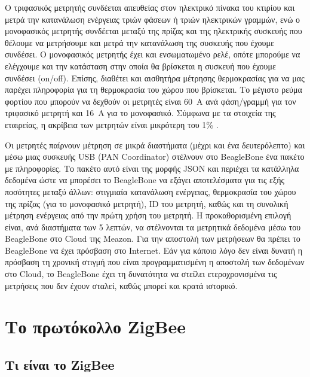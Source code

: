 \documentclass[12pt, a4paper, oneside]{report}
\begin{document}
Ο τριφασικός μετρητής συνδέεται απευθείας στον ηλεκτρικό πίνακα του κτιρίου και μετρά την κατανάλωση ενέργειας τριών φάσεων ή τριών ηλεκτρικών γραμμών, ενώ ο μονοφασικός μετρητής συνδέεται μεταξύ της πρίζας και της ηλεκτρικής συσκευής που θέλουμε να μετρήσουμε και μετρά την κατανάλωση της συσκευής που έχουμε συνδέσει. Ο μονοφασικός μετρητής έχει και ενσωματωμένο ρελέ, οπότε μπορούμε να ελέγχουμε και την κατάσταση στην οποία θα βρίσκεται η συσκευή που έχουμε συνδέσει (on\slash of\mbox{}f). Επίσης, διαθέτει και αισθητήρα μέτρησης θερμοκρασίας για να μας παρέχει πληροφορία για τη θερμοκρασία του χώρου που βρίσκεται. Το μέγιστο ρεύμα φορτίου που μπορούν να δεχθούν οι μετρητές είναι 60~A ανά φάση\slash γραμμή για τον τριφασικό μετρητή και 16~A για το μονοφασικό. Σύμφωνα με τα στοιχεία της εταιρείας, η ακρίβεια των μετρητών είναι μικρότερη του 1\% \cite{biz,din}.

Οι μετρητές παίρνουν μέτρηση σε μικρά διαστήματα (μέχρι και ένα δευτερόλεπτο) και μέσω μιας συσκευής USB (PAN Coordinator) στέλνουν στο BeagleBone ένα πακέτο με πληροφορίες. Το πακέτο αυτό είναι της μορφής JSON και περιέχει τα κατάλληλα δεδομένα ώστε να μπορέσει το BeagleBone να εξάγει αποτελέσματα για τις εξής ποσότητες μεταξύ άλλων: στιγμιαία κατανάλωση ενέργειας, θερμοκρασία του χώρου της πρίζας (για το μονοφασικό μετρητή), ID του μετρητή, καθώς και τη συνολική μέτρηση ενέργειας από την πρώτη χρήση του μετρητή. Η προκαθορισμένη επιλογή είναι, ανά διαστήματα των 5 λεπτών, να στέλνονται τα μετρητικά δεδομένα μέσω του BeagleBone στο Cloud της Meazon. Για την αποστολή των μετρήσεων θα πρέπει το BeagleBone να έχει πρόσβαση στο Internet. Εάν για κάποιο λόγο δεν είναι δυνατή η πρόσβαση τη χρονική στιγμή που είναι προγραμματισμένη η αποστολή των δεδομένων στο Cloud, το BeagleBone έχει τη δυνατότητα να στείλει ετεροχρονισμένα τις μετρήσεις που δεν έχουν σταλεί, καθώς μπορεί και κρατά ιστορικό.

\section{Το πρωτόκολλο ZigBee}

\subsection{Τι είναι το ZigBee}
\end{document}
